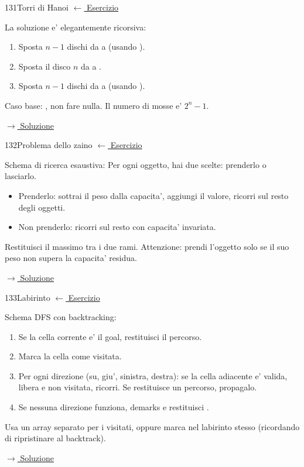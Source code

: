 \label{hint:131}
\begin{hintbox}{131}{Torri di Hanoi}
\small\color{black!55}\hyperref[ex:131]{$\leftarrow$ Esercizio}\normalsize\color{black}

La soluzione e' elegantemente ricorsiva:
\begin{enumerate}[leftmargin=2em]
  \item Sposta $n-1$ dischi da  a  (usando ).
  \item Sposta il disco $n$ da  a .
  \item Sposta $n-1$ dischi da  a  (usando ).
\end{enumerate}
Caso base: , non fare nulla.
Il numero di mosse e' $2^n - 1$.

\small\color{black!55}\hyperref[sol:131]{$\rightarrow$ Soluzione}\normalsize\color{black}
\end{hintbox}

\label{hint:132}
\begin{hintbox}{132}{Problema dello zaino}
\small\color{black!55}\hyperref[ex:132]{$\leftarrow$ Esercizio}\normalsize\color{black}

Schema di ricerca esaustiva:
Per ogni oggetto, hai due scelte: prenderlo o lasciarlo.
\begin{itemize}[leftmargin=2em]
  \item Prenderlo: sottrai il peso dalla capacita', aggiungi
        il valore, ricorri sul resto degli oggetti.
  \item Non prenderlo: ricorri sul resto con capacita' invariata.
\end{itemize}
Restituisci il massimo tra i due rami.
Attenzione: prendi l'oggetto solo se il suo peso non supera
la capacita' residua.

\small\color{black!55}\hyperref[sol:132]{$\rightarrow$ Soluzione}\normalsize\color{black}
\end{hintbox}

\label{hint:133}
\begin{hintbox}{133}{Labirinto}
\small\color{black!55}\hyperref[ex:133]{$\leftarrow$ Esercizio}\normalsize\color{black}

Schema DFS con backtracking:
\begin{enumerate}[leftmargin=2em]
  \item Se la cella corrente e' il goal, restituisci il percorso.
  \item Marca la cella come visitata.
  \item Per ogni direzione (su, giu', sinistra, destra):
        se la cella adiacente e' valida, libera e non visitata,
        ricorri. Se restituisce un percorso, propagalo.
  \item Se nessuna direzione funziona, demarks e restituisci .
\end{enumerate}
Usa un array separato per i visitati, oppure marca nel labirinto stesso
(ricordando di ripristinare al backtrack).

\small\color{black!55}\hyperref[sol:133]{$\rightarrow$ Soluzione}\normalsize\color{black}
\end{hintbox}

